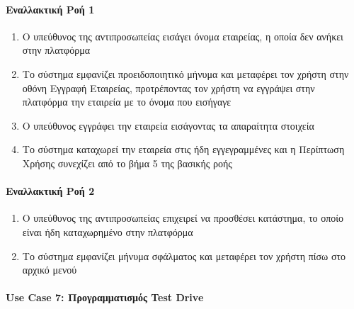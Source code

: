 \documentclass{../ol-softwaremanual}
\begin{document}
	\paragraph{Εναλλακτική Ροή 1}
	
	\begin{enumerate}
		\item Ο υπεύθυνος της αντιπροσωπείας εισάγει όνομα εταιρείας, η οποία δεν ανήκει στην πλατφόρμα
		\item Το σύστημα εμφανίζει προειδοποιητικό μήνυμα και μεταφέρει τον χρήστη στην οθόνη Εγγραφή Εταιρείας, προτρέποντας τον χρήστη να εγγράψει στην πλατφόρμα την εταιρεία με το όνομα που εισήγαγε		
		\item Ο υπεύθυνος εγγράφει την εταιρεία εισάγοντας τα απαραίτητα στοιχεία
		\item Το σύστημα καταχωρεί την εταιρεία στις ήδη εγγεγραμμένες και η Περίπτωση Χρήσης συνεχίζει από το βήμα 5 της βασικής ροής
	\end{enumerate}
	
	\paragraph{Εναλλακτική Ροή 2}
	
	\begin{enumerate}
		\item Ο υπεύθυνος της αντιπροσωπείας επιχειρεί να προσθέσει κατάστημα, το οποίο είναι ήδη καταχωρημένο στην πλατφόρμα
		\item Το σύστημα εμφανίζει μήνυμα σφάλματος και μεταφέρει τον χρήστη πίσω στο αρχικό μενού
	\end{enumerate}
	
	
	\paragraph{\en Use Case 7: \gr Προγραμματισμός \en Test Drive \gr}
	
\end{document}
